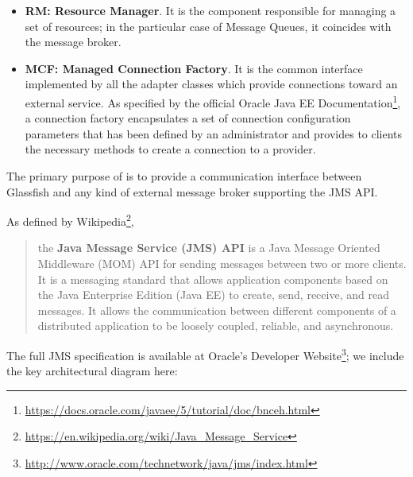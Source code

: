 \begin{itemize}
	\item \textbf{RM: Resource Manager}. It is the component responsible for managing a set of resources; in the particular case of Message Queues, it coincides with the message broker. 
	\item \textbf{MCF: Managed Connection Factory}. It is the common interface implemented by all the adapter classes which provide connections toward an external service. As specified by the official Oracle Java EE Documentation\footnote{\url{https://docs.oracle.com/javaee/5/tutorial/doc/bnceh.html}}, a connection factory encapsulates a set of connection configuration parameters that has been defined by an administrator and provides to clients the necessary methods to create a connection to a provider.
\end{itemize}

The primary purpose of  is to provide a communication interface between Glassfish and any kind of external message broker supporting the JMS API.  

As defined by Wikipedia\footnote{\url{https://en.wikipedia.org/wiki/Java_Message_Service}},
\begin{quote}the \textbf{Java Message Service (JMS) API} is a Java Message Oriented Middleware (MOM) API for sending messages between two or more clients. It is a messaging standard that allows application components based on the Java Enterprise Edition (Java EE) to create, send, receive, and read messages. It allows the communication between different components of a distributed application to be loosely coupled, reliable, and asynchronous.
\end{quote}

The full JMS specification is available at Oracle's Developer Website\footnote{\url{http://www.oracle.com/technetwork/java/jms/index.html}}; we include the key architectural diagram here: 
\begin{figure}[H]
\centering
{}
\end{figure}

